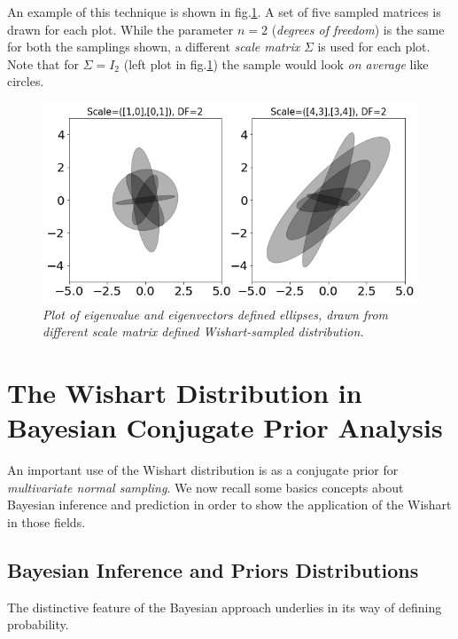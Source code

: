 \documentclass[12pt,openright,twoside,a4paper]{book}
\begin{document}
An example of this technique is shown in fig.\ref{Wish-eig}. A set of five sampled matrices is drawn for each plot. While the parameter $n=2$ (\textit{degrees of freedom}) is the same for both the samplings shown, a different \textit{scale matrix} $\Sigma$ is used for each plot.
Note that for $\Sigma=I_2$ (left plot in fig.\ref{Wish-eig}) the sample would look \textit{on average} like circles.

\begin{figure}[!h]
\centering
\includegraphics[scale=0.37]{wisheig-df2}
\caption{\textit{Plot of eigenvalue and eigenvectors defined ellipses, drawn from different scale matrix defined Wishart-sampled distribution. }}
\label{Wish-eig}
\end{figure}

\section{The Wishart Distribution in Bayesian Conjugate Prior Analysis}

An important use of the Wishart distribution is as a conjugate prior for \textit{multivariate normal sampling}. We now recall some basics concepts about Bayesian inference and prediction in order to show the application of the Wishart in those fields.

\subsection{Bayesian Inference and Priors Distributions}

The distinctive feature of the Bayesian approach underlies in its way of defining probability.
\end{document}
